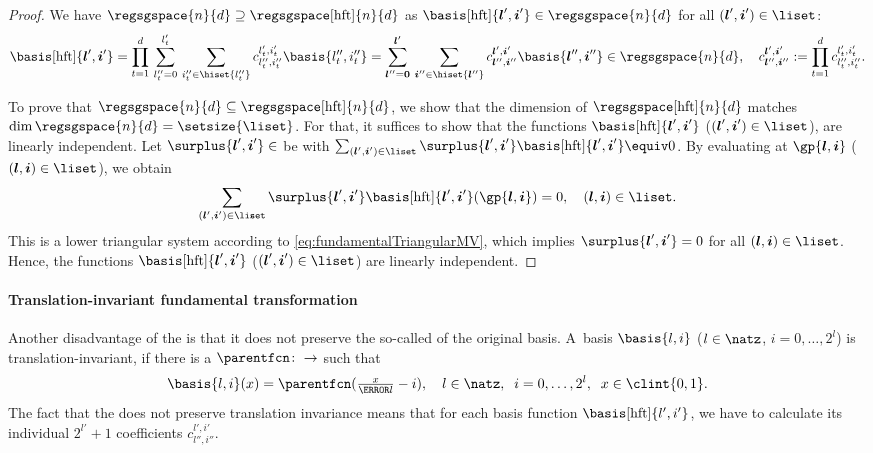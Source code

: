 \begin{proof}
  We have $\regsgspace{n}{d} \supset \regsgspace[\hft]{n}{d}$ as
  $\basis[\hft]{\*l',\*i'} \in \regsgspace{n}{d}$
  for all $(\*l', \*i') \in \liset$:
  \begin{equation}
    \basis[\hft]{\*l',\*i'}
    = \prod_{t=1}^d \, \sum_{l''_t=0}^{l'_t} \, \sum_{i''_t \in \hiset{l''_t}}
    c_{l''_t,i''_t}^{l'_t,i'_t} \basis{l''_t,i''_t}
    = \sum_{\*l''=\*0}^{\*l'} \, \sum_{\*i'' \in \hiset{\*l''}}
    c_{\*l'',\*i''}^{\*l',\*i'} \basis{\*l'',\*i''}
    \in \regsgspace{n}{d},\quad
    c_{\*l'',\*i''}^{\*l',\*i'}
    := \prod_{t=1}^d c_{l''_t,i''_t}^{l'_t,i'_t}.
  \end{equation}
  
  To prove that $\regsgspace{n}{d} \subset \regsgspace[\hft]{n}{d}$,
  we show that the dimension of $\regsgspace[\hft]{n}{d}$
  matches $\dim \regsgspace{n}{d} = \setsize{\liset}$.
  For that, it suffices to show that
  the functions $\basis[\hft]{\*l',\*i'}$ ($(\*l', \*i') \in \liset$),
  are linearly independent.
  Let $\surplus{\*l',\*i'} \in \real$ be with
  $\sum_{(\*l', \*i') \in \liset}
  \surplus{\*l',\*i'} \basis[\hft]{\*l',\*i'} \equiv 0$.
  By evaluating at $\gp{\*l,\*i}$ ($(\*l, \*i) \in \liset$), we obtain
  \begin{equation}
    \sum_{(\*l', \*i') \in \liset}
    \surplus{\*l',\*i'} \basis[\hft]{\*l',\*i'}(\gp{\*l,\*i}) = 0,\quad
    (\*l, \*i) \in \liset.
  \end{equation}
  This is a lower triangular system according to
  \eqref{eq:fundamentalTriangularMV},
  which implies $\surplus{\*l',\*i'} = 0$ for all $(\*l, \*i) \in \liset$.
  Hence, the functions $\basis[\hft]{\*l',\*i'}$ ($(\*l', \*i') \in \liset$)
  are linearly independent.
\end{proof}

\paragraph{Translation-invariant fundamental transformation}

Another disadvantage of the \hftr is that it does not preserve
the so-called  of the original basis.
A~basis $\basis{l,i}$ ($l \in \natz$, $i = 0, \dotsc, 2^l$)
is translation-invariant, if there is a 
$\parentfcn\colon \real \to \real$
such that
\begin{equation}
  \label{eq:translationInvariance}
  \basis{l,i}(x)
  = \parentfcn(\tfrac{x}{\ms{l}} - i),\quad
  l \in \natz,\;\;
  i = 0, \dotsc, 2^l,\;\;
  x \in \clint{0, 1}.
\end{equation}
The fact that the \hftr does not preserve translation invariance means
that for each basis function $\basis[\hft]{l',i'}$, we have to
calculate its individual $2^{l'} + 1$ coefficients $c_{l'',i''}^{l',i'}$.


